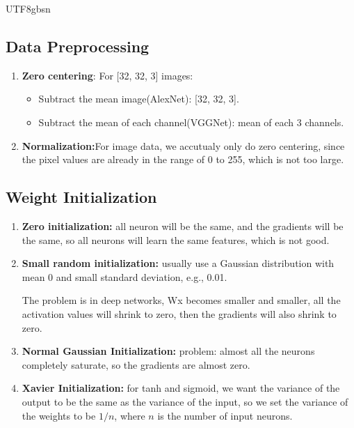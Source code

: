 \documentclass{article}
\numberwithin{equation}{section}
\begin{document}
\begin{CJK}{UTF8}{gbsn}
\subsection{Data Preprocessing}\par
\begin{enumerate}
    \item \textbf{Zero centering}:
    For [32, 32, 3] images:
    \begin{itemize}
        \item Subtract the mean image(AlexNet): [32, 32, 3].\par
        \item Subtract the mean of each channel(VGGNet): mean of each 3 channels.\par
    \end{itemize}
    \item \textbf{Normalization:}For image data, we accutualy only do zero centering, since the pixel values are already in the range of 0 to 255, which is not too large.\par
\end{enumerate}

\subsection{Weight Initialization}\par
\begin{enumerate}
    \item \textbf{Zero initialization:} all neuron will be the same, and the gradients will be the same, so all neurons will learn the same features, which is not good.\par
    \item \textbf{Small random initialization:} usually use a Gaussian distribution with mean 0 and small standard deviation, e.g., 0.01.\par
    The problem is in deep networks, Wx becomes smaller and smaller, all the activation values will shrink to zero, then the gradients will also shrink to zero.\par
    \item \textbf{Normal Gaussian Initialization:} problem: almost all the neurons completely saturate, so the gradients are almost zero.\par
    \item \textbf{Xavier Initialization:} for tanh and sigmoid, we want the variance of the output to be the same as the variance of the input, so we set the variance of the weights to be \(1/n\), where \(n\) is the number of input neurons.\par
\end{enumerate}


\end{CJK}
\end{document}
